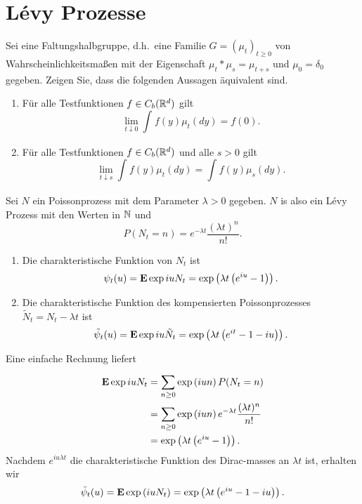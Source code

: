 \section{L\'evy Prozesse}

Sei eine Faltungshalbgruppe, d.h.\ eine Familie $G=(\mu_t)_{t\geq 0}$ von
Wahrscheinlichkeitsmaßen mit der Eigenschaft $\mu_t * \mu_s = \mu_{t+s}$ und
$\mu_0 = \delta_0$ gegeben. Zeigen Sie, dass die folgenden Aussagen äquivalent
sind.
\begin{enumerate}
    \item Für alle Testfunktionen $f\in C_b(\mathbb R^d)$ gilt
        \begin{equation*}
            \lim_{t\downarrow 0} \int_{}^{} f(y) \mu_t(dy) = f(0).
        \end{equation*}
    \item Für alle Testfunktionen $f\in C_b(\mathbb R^d)$ und alle $s>0$ gilt
        \begin{equation*}
            \lim_{t\downarrow s} \int_{}^{} f(y) \mu_t(dy) =
            \int_{}^{} f(y) \mu_s(dy). 
        \end{equation*}
\end{enumerate}

 Sei $N$ ein
Poissonprozess mit dem Parameter $\lambda>0$ gegeben. $N$ is also ein L\'evy
Prozess mit den Werten in $\mathbb N$ und 
\begin{equation*}
    P(N_t = n) = e^{- \lambda t} \frac{ (\lambda t)^n}{ n!}.
\end{equation*}
\begin{enumerate}
    \item Die charakteristische Funktion von $N_t$ ist 
        \begin{equation*}
            \psi_t(u) = \mathbf{E} \exp iu N_t = \exp \left( \lambda t \left( e^{iu} -1\right) \right).
        \end{equation*}
    \item Die charakteristische Funktion des kompensierten Poissonprozesses
        $\tilde N_t = N_t - \lambda t$ ist 
        \begin{equation*}
            \tilde \psi_t (u) = \mathbf{E} \exp iu \tilde N_t = 
            \exp \left( \lambda t \left( e^{it}-1-iu \right) \right). 
        \end{equation*}
\end{enumerate} 

\solution Eine einfache Rechnung liefert
\begin{align*}
    \mathbf{E} \exp iu N_t &= \sum_{n\geq 0}^{} \exp \left( iun  \right) P (N_t = n) \\
    &= \sum_{n\geq 0}^{} \exp \left( iun \right) e^{-\lambda t} \frac{(\lambda t)^n}{n!} \\
    &= \exp \left( \lambda t \left( e^{iu}-1 \right) \right). 
\end{align*}
Nachdem $e^{i u \lambda t}$ die charakteristische Funktion des Dirac-masses an 
$\lambda t$ ist, erhalten wir 
\begin{equation*}
    \tilde \psi_t(u) = \mathbf{E} \exp \left( i u N_t \right) = 
    \exp \left( \lambda t \left( e^{iu}-1-iu \right) \right). 
\end{equation*}

